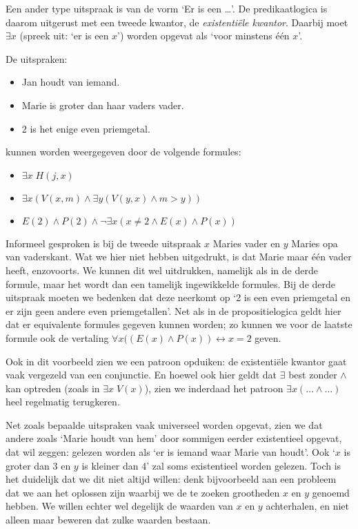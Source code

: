 Een ander type uitspraak is van de vorm `Er is een \ldots'. De predikaatlogica is daarom uitgerust met een tweede kwantor, de \textit{existenti\"ele kwantor}. Daarbij moet $\exists x$ (spreek uit: `er is een $x$') worden opgevat als `voor minstens \'e\'en $x$'.

\begin{example}\label{vb:pred:vader}
De uitspraken:
\begin{itemize}
    \item Jan houdt van iemand.
    \item Marie is groter dan haar vaders vader.
    \item 2 is het enige even priemgetal.
\end{itemize}
kunnen worden weergegeven door de volgende formules:
\begin{itemize}
    \item $\exists x\; H(j,x)$
    \item $\exists x(V(x,m)\wedge\exists y(V(y,x)\wedge m>y))$
    \item $E(2)\wedge P(2)\wedge\neg\exists x(x\not= 2\wedge E(x)\wedge P(x))$
\end{itemize}
Informeel gesproken is bij de tweede uitspraak $x$ Maries vader en $y$ Maries opa van vaderskant. Wat we hier niet hebben uitgedrukt, is dat Marie maar \'e\'en vader heeft, enzovoorts. We kunnen dit wel uitdrukken, namelijk als in de derde formule, maar het wordt dan een tamelijk ingewikkelde formules. Bij de derde uitspraak moeten we bedenken dat deze neerkomt op `2 is een even priemgetal en er zijn geen andere even priemgetallen'. Net als in de propositielogica geldt hier dat er equivalente formules gegeven kunnen worden; zo kunnen we voor de laatste formule ook de vertaling $ \forall x((E(x)\wedge P(x))\leftrightarrow x=2$ geven.
\end{example}

Ook in dit voorbeeld zien we een patroon opduiken: de existenti\"ele kwantor gaat vaak vergezeld van een conjunctie. En hoewel ook hier geldt dat $\exists$ best zonder $\wedge$ kan optreden (zoals in $\exists x\; V(x)$), zien we inderdaad het patroon $\exists x(\ldots\wedge\ldots)$ heel regelmatig terugkeren.

Net zoals bepaalde uitspraken vaak universeel worden opgevat, zien we dat andere zoals `Marie houdt van hem' door sommigen eerder existentieel opgevat, dat wil zeggen: gelezen worden als `er is iemand waar Marie van houdt'. Ook `$x$ is groter dan 3 en $y$ is kleiner dan 4' zal soms existentieel worden gelezen. Toch is het duidelijk dat we dit niet altijd willen: denk bijvoorbeeld aan een probleem dat we aan het oplossen zijn waarbij we de te zoeken grootheden $x$ en $y$ genoemd hebben. We willen echter wel degelijk de waarden van $x$ en $y$ achterhalen, en niet alleen maar beweren dat zulke waarden bestaan.

